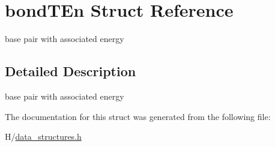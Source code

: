 \hypertarget{structbondTEn}{
\section{bondTEn Struct Reference}
\label{structbondTEn}
}


base pair with associated energy  




\subsection{Detailed Description}
base pair with associated energy 

The documentation for this struct was generated from the following file:\begin{DoxyCompactItemize}
\item 
H/\hyperlink{data__structures_8h}{data\_\-structures.h}\end{DoxyCompactItemize}
